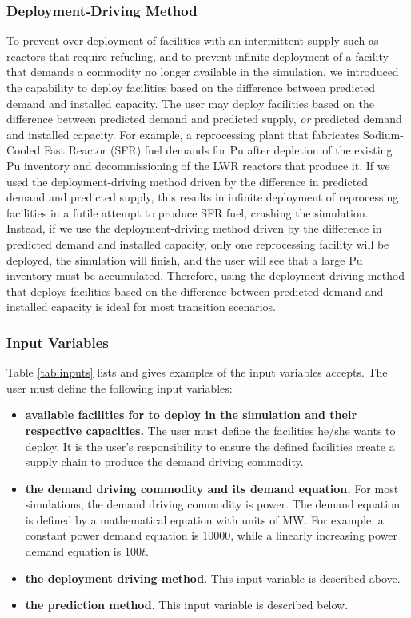 \subsubsection{\textbf{Deployment-Driving Method}}
\label{sec:ddm}
To prevent over-deployment of facilities with an intermittent 
supply such as reactors that require refueling, and
to prevent infinite deployment of a facility that demands 
a commodity no longer available in the simulation, 
we introduced the capability to deploy facilities 
based on the difference between predicted demand and installed capacity. 
The user may deploy facilities based on the difference 
between predicted demand and predicted supply, \textit{or}
predicted demand and installed capacity. 
For example, a reprocessing plant that fabricates Sodium-Cooled Fast Reactor 
(SFR) fuel demands for Pu after depletion of the existing Pu inventory and 
decommissioning of the LWR reactors that produce it. 
If we used the deployment-driving method driven by 
the difference in predicted demand and predicted supply, this results in 
infinite deployment of reprocessing facilities in a futile attempt 
to produce SFR fuel, crashing the simulation. 
Instead, if we use the deployment-driving method driven by the
difference in predicted demand and installed capacity, only one reprocessing 
facility will be deployed, the simulation will finish, and the user will see that 
a large Pu inventory must be accumulated. 
Therefore, using the deployment-driving method that deploys facilities based on 
the difference between predicted demand and installed capacity is ideal for most 
transition scenarios. 

\subsubsection{\textbf{Input Variables}}
Table \ref{tab:inputs} lists and gives examples of the input 
variables \deploy accepts. 
The user must define the following input variables: 
\begin{itemize}
\item \textbf{available facilities for \deploy to deploy in the simulation and their respective capacities.}
The user must define the facilities he/she wants \deploy to deploy. It is the user's responsibility to 
ensure the defined facilities create a supply chain to produce the demand driving commodity.
\item \textbf{the demand driving commodity and its demand equation.} For most simulations, the demand driving 
commodity is power. The demand equation is defined by a mathematical equation with units of MW. For example, 
a constant power demand equation is $10000$, while a linearly increasing power demand equation is $100t$.
\item \textbf{the deployment driving method}. This input variable is described above.
\item \textbf{the prediction method}. This input variable is described below.
\end{itemize}

